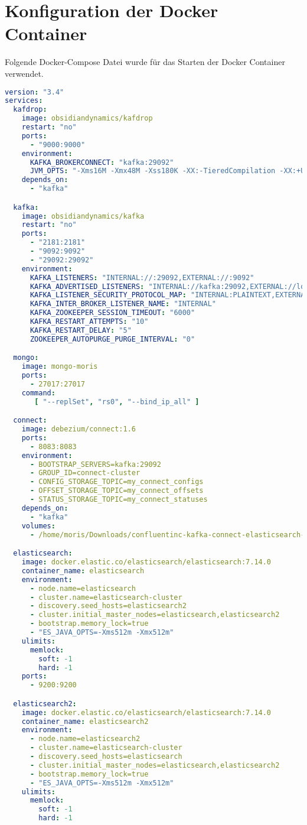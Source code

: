 \chapter{Konfiguration der Docker Container}

Folgende Docker-Compose Datei wurde für das Starten der Docker Container verwendet.

\begin{lstlisting}[language=yaml]
    version: "3.4"
services:
  kafdrop:
    image: obsidiandynamics/kafdrop
    restart: "no"
    ports:
      - "9000:9000"
    environment:
      KAFKA_BROKERCONNECT: "kafka:29092"
      JVM_OPTS: "-Xms16M -Xmx48M -Xss180K -XX:-TieredCompilation -XX:+UseStringDeduplication -noverify"
    depends_on:
      - "kafka"

  kafka:
    image: obsidiandynamics/kafka
    restart: "no"
    ports:
      - "2181:2181"
      - "9092:9092"
      - "29092:29092"
    environment:
      KAFKA_LISTENERS: "INTERNAL://:29092,EXTERNAL://:9092"
      KAFKA_ADVERTISED_LISTENERS: "INTERNAL://kafka:29092,EXTERNAL://localhost:9092"
      KAFKA_LISTENER_SECURITY_PROTOCOL_MAP: "INTERNAL:PLAINTEXT,EXTERNAL:PLAINTEXT"
      KAFKA_INTER_BROKER_LISTENER_NAME: "INTERNAL"
      KAFKA_ZOOKEEPER_SESSION_TIMEOUT: "6000"
      KAFKA_RESTART_ATTEMPTS: "10"
      KAFKA_RESTART_DELAY: "5"
      ZOOKEEPER_AUTOPURGE_PURGE_INTERVAL: "0"

  mongo:
    image: mongo-moris
    ports:
      - 27017:27017
    command:
       [ "--replSet", "rs0", "--bind_ip_all" ]

  connect:
    image: debezium/connect:1.6
    ports:
      - 8083:8083
    environment:
      - BOOTSTRAP_SERVERS=kafka:29092
      - GROUP_ID=connect-cluster
      - CONFIG_STORAGE_TOPIC=my_connect_configs
      - OFFSET_STORAGE_TOPIC=my_connect_offsets
      - STATUS_STORAGE_TOPIC=my_connect_statuses
    depends_on:
      - "kafka"
    volumes:
      - /home/moris/Downloads/confluentinc-kafka-connect-elasticsearch-11.1.0:/kafka/connect/confluentinc-kafka-connect-elasticsearch-11.1.0

  elasticsearch:
    image: docker.elastic.co/elasticsearch/elasticsearch:7.14.0
    container_name: elasticsearch
    environment:
      - node.name=elasticsearch
      - cluster.name=elasticsearch-cluster
      - discovery.seed_hosts=elasticsearch2
      - cluster.initial_master_nodes=elasticsearch,elasticsearch2
      - bootstrap.memory_lock=true
      - "ES_JAVA_OPTS=-Xms512m -Xmx512m"
    ulimits:
      memlock:
        soft: -1
        hard: -1
    ports:
      - 9200:9200

  elasticsearch2:
    image: docker.elastic.co/elasticsearch/elasticsearch:7.14.0
    container_name: elasticsearch2
    environment:
      - node.name=elasticsearch2
      - cluster.name=elasticsearch-cluster
      - discovery.seed_hosts=elasticsearch
      - cluster.initial_master_nodes=elasticsearch,elasticsearch2
      - bootstrap.memory_lock=true
      - "ES_JAVA_OPTS=-Xms512m -Xmx512m"
    ulimits:
      memlock:
        soft: -1
        hard: -1
\end{lstlisting}